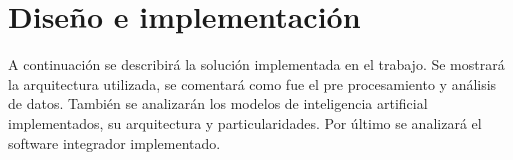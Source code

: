 \chapter{Diseño e implementación} %

A continuación se describirá la solución implementada en el trabajo. Se mostrará la arquitectura utilizada, se comentará como fue el pre procesamiento y análisis de datos. También se analizarán los modelos de inteligencia artificial implementados, su arquitectura y particularidades. Por último se analizará el software integrador implementado.

\label{Chapter3} %


